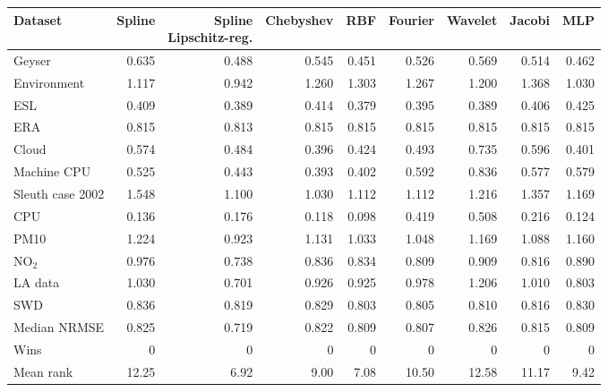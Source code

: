 \begin{tabular}{lrrrrrrrr}
\toprule
Dataset & Spline & \shortstack{Spline\\Lipschitz-reg.} & Chebyshev & RBF & Fourier & Wavelet & Jacobi & MLP \\
\midrule
Geyser & 0.635 & 0.488 & 0.545 & 0.451 & 0.526 & 0.569 & 0.514 & 0.462 \\
Environment & 1.117 & 0.942 & 1.260 & 1.303 & 1.267 & 1.200 & 1.368 & 1.030 \\
ESL & 0.409 & 0.389 & 0.414 & 0.379 & 0.395 & 0.389 & 0.406 & 0.425 \\
ERA & 0.815 & 0.813 & 0.815 & 0.815 & 0.815 & 0.815 & 0.815 & 0.815 \\
Cloud & 0.574 & 0.484 & 0.396 & 0.424 & 0.493 & 0.735 & 0.596 & 0.401 \\
Machine CPU & 0.525 & 0.443 & 0.393 & 0.402 & 0.592 & 0.836 & 0.577 & 0.579 \\
Sleuth case 2002 & 1.548 & 1.100 & 1.030 & 1.112 & 1.112 & 1.216 & 1.357 & 1.169 \\
CPU & 0.136 & 0.176 & 0.118 & 0.098 & 0.419 & 0.508 & 0.216 & 0.124 \\
PM10 & 1.224 & 0.923 & 1.131 & 1.033 & 1.048 & 1.169 & 1.088 & 1.160 \\
NO$_2$ & 0.976 & 0.738 & 0.836 & 0.834 & 0.809 & 0.909 & 0.816 & 0.890 \\
LA data & 1.030 & 0.701 & 0.926 & 0.925 & 0.978 & 1.206 & 1.010 & 0.803 \\
SWD & 0.836 & 0.819 & 0.829 & 0.803 & 0.805 & 0.810 & 0.816 & 0.830 \\
\midrule
Median NRMSE & 0.825 & 0.719 & 0.822 & 0.809 & 0.807 & 0.826 & 0.815 & 0.809 \\
Wins & 0 & 0 & 0 & 0 & 0 & 0 & 0 & 0 \\
Mean rank & 12.25 & 6.92 & 9.00 & 7.08 & 10.50 & 12.58 & 11.17 & 9.42 \\
\bottomrule\end{tabular}
